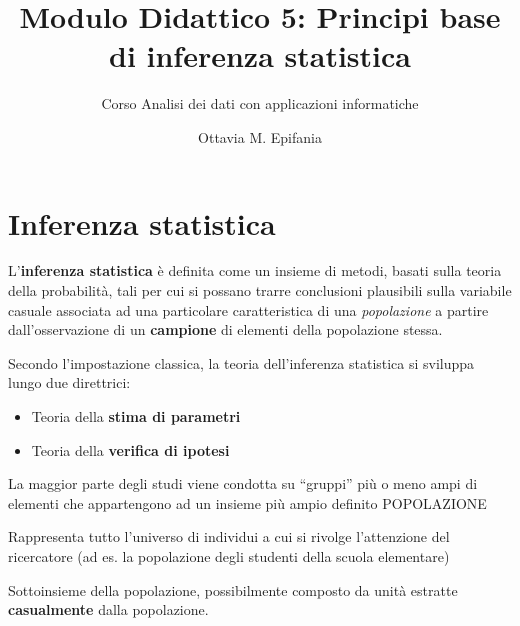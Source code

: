 \documentclass[
  ignorenonframetext,
  compress, aspectratio=149]{beamer}
\title{Modulo Didattico 5: Principi base di inferenza statistica}
\subtitle{Corso Analisi dei dati con applicazioni informatiche}
\author{Ottavia M. Epifania}
\date{}
\providecommand{\tightlist}{%
  \setlength{\itemsep}{0pt}\setlength{\parskip}{0pt}}
\begin{document}
\frame{\titlepage}


\section{Inferenza statistica}\label{inferenza-statistica}

\begin{frame}{}
\label{section}
L'\textbf{inferenza statistica} è definita come un insieme di metodi,
basati sulla teoria della probabilità, tali per cui si possano trarre
conclusioni plausibili sulla variabile casuale associata ad una
particolare caratteristica di una \emph{popolazione} a partire
dall'osservazione di un \textbf{campione} di elementi della popolazione
stessa.

\vspace{3mm}

Secondo l'impostazione classica, la teoria dell'inferenza statistica si
sviluppa lungo due direttrici:

\begin{itemize}
\tightlist
\item
  Teoria della \textbf{stima di parametri}
\item
  Teoria della \textbf{verifica di ipotesi}
\end{itemize}
\end{frame}

\begin{frame}{}
\label{section-1}
La maggior parte degli studi viene condotta su ``gruppi'' più o meno
ampi di elementi che appartengono ad un insieme più ampio definito
POPOLAZIONE

\begin{tcolorbox}[enhanced jigsaw, opacityback=0, bottomtitle=1mm, bottomrule=.15mm, titlerule=0mm, coltitle=black, toprule=.15mm, breakable, toptitle=1mm, colbacktitle=quarto-callout-tip-color!10!white, arc=.35mm, title={Popolazione}, rightrule=.15mm, leftrule=.75mm, opacitybacktitle=0.6, left=2mm, colframe=quarto-callout-tip-color-frame, colback=white]

Rappresenta tutto l'universo di individui a cui si rivolge l'attenzione
del ricercatore (ad es. la popolazione degli studenti della scuola
elementare)

\end{tcolorbox}

\begin{tcolorbox}[enhanced jigsaw, opacityback=0, bottomtitle=1mm, bottomrule=.15mm, titlerule=0mm, coltitle=black, toprule=.15mm, breakable, toptitle=1mm, colbacktitle=quarto-callout-tip-color!10!white, arc=.35mm, title={Campione}, rightrule=.15mm, leftrule=.75mm, opacitybacktitle=0.6, left=2mm, colframe=quarto-callout-tip-color-frame, colback=white]

Sottoinsieme della popolazione, possibilmente composto da unità estratte
\textbf{casualmente} dalla popolazione.

\end{tcolorbox}
\end{frame}
\end{document}
